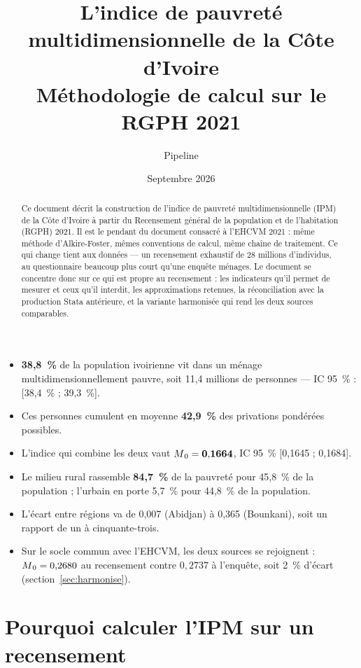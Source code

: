 \documentclass[11pt,a4paper]{article}
\title{\bfseries L'indice de pauvreté multidimensionnelle de la Côte d'Ivoire\\[4pt]
\large Méthodologie de calcul sur le RGPH 2021}
\author{Pipeline \col{PythonIPM}}
\date{Septembre 2026}
\begin{document}
\maketitle

\begin{abstract}
\noindent Ce document décrit la construction de l'indice de pauvreté multidimensionnelle (IPM) de
la Côte d'Ivoire à partir du Recensement général de la population et de l'habitation (RGPH) 2021.
Il est le pendant du document consacré à l'EHCVM 2021 : même méthode d'Alkire-Foster, mêmes
conventions de calcul, même chaîne de traitement. Ce qui change tient aux données — un recensement
exhaustif de 28 millions d'individus, au questionnaire beaucoup plus court qu'une enquête ménages.
Le document se concentre donc sur ce qui est propre au recensement : les indicateurs qu'il permet
de mesurer et ceux qu'il interdit, les approximations retenues, la réconciliation avec la
production Stata antérieure, et la variante harmonisée qui rend les deux sources comparables.
\end{abstract}

\begin{retenir}
\begin{itemize}
  \item \textbf{38,8~\%} de la population ivoirienne vit dans un ménage multidimensionnellement
        pauvre, soit 11,4 millions de personnes --- IC 95~\% : [38,4~\% ; 39,3~\%].
  \item Ces personnes cumulent en moyenne \textbf{42,9~\%} des privations pondérées possibles.
  \item L'indice qui combine les deux vaut $M\textsubscript{0} = \mathbf{0{,}1664}$, IC 95~\%
        [0,1645 ; 0,1684].
  \item Le milieu rural rassemble \textbf{84,7~\%} de la pauvreté pour 45,8~\% de la population ;
        l'urbain en porte 5,7~\% pour 44,8~\% de la population.
  \item L'écart entre régions va de 0,007 (Abidjan) à 0,365 (Bounkani), soit un rapport de
        un à cinquante-trois.
  \item Sur le socle commun avec l'EHCVM, les deux sources se rejoignent :
        $M\textsubscript{0} = 0{,}2680$ au recensement contre $0{,}2737$ à l'enquête, soit 2~\% d'écart
        (section~\ref{sec:harmonise}).
\end{itemize}
\end{retenir}

\tableofcontents
\bigskip

\section{Pourquoi calculer l'IPM sur un recensement}
\end{document}

